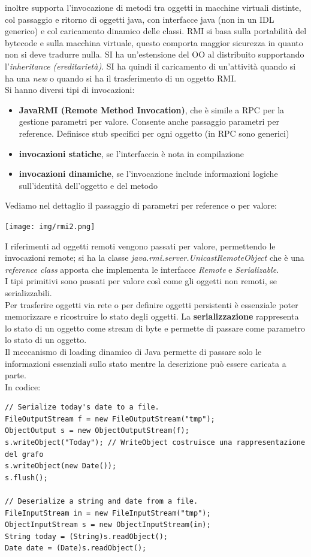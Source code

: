 \documentclass[a4paper,12pt, oneside]{book}
\begin{document}
inoltre supporta l'invocazione di metodi tra oggetti in macchine virtuali distinte,
col passaggio e ritorno di oggetti java, con interfacce java (non in un IDL generico)
e col caricamento dinamico delle classi. RMI si basa sulla portabilità del bytecode e sulla macchina virtuale,
questo comporta maggior sicurezza in quanto non si deve tradurre nulla. SI ha un'estensione del OO al distribuito supportando l'\textit{inheritance (ereditarietà)}.
SI ha quindi il caricamento di un'attività quando si ha una \textit{new} o quando si ha il
trasferimento di un oggetto RMI.\\
Si hanno diversi tipi di invocazioni:
\begin{itemize}
\item \textbf{JavaRMI (Remote Method Invocation)}, che è simile a RPC per la gestione parametri per valore.
  Consente anche passaggio parametri per reference.
  Definisce stub specifici per ogni oggetto (in RPC sono generici)
\item \textbf{invocazioni statiche}, se l'interfaccia è nota in compilazione
\item \textbf{invocazioni dinamiche}, se l'invocazione include informazioni logiche sull’identità dell’oggetto e del metodo
\end{itemize}
Vediamo nel dettaglio il passaggio di parametri per reference o per valore:
\begin{center}
\texttt{[image: img/rmi2.png]}
\end{center}
I riferimenti ad oggetti remoti vengono passati per valore, permettendo le
invocazioni remote; si ha la classe \textit{java.rmi.server.UnicastRemoteObject}
che è una \textit{reference class} apposta che implementa le interfacce \textit{Remote} e \textit{Serializable}.\\
I tipi primitivi sono passati per valore così come gli oggetti non remoti, se serializzabili.\\
Per trasferire oggetti via rete o per definire oggetti persistenti è essenziale poter memorizzare e ricostruire lo stato degli oggetti.
La \textbf{serializzazione} rappresenta lo stato di un oggetto come
stream di byte e permette di passare come parametro lo stato di un oggetto.\\
Il meccanismo di loading dinamico di Java permette di
passare solo le informazioni essenziali sullo stato mentre la descrizione può essere caricata a parte.\\
In codice:
\begin{verbatim}
// Serialize today's date to a file.
FileOutputStream f = new FileOutputStream("tmp");
ObjectOutput s = new ObjectOutputStream(f);
s.writeObject("Today"); // WriteObject costruisce una rappresentazione del grafo
s.writeObject(new Date());
s.flush();

// Deserialize a string and date from a file.
FileInputStream in = new FileInputStream("tmp");
ObjectInputStream s = new ObjectInputStream(in);
String today = (String)s.readObject();
Date date = (Date)s.readObject();
\end{verbatim}
\end{document}
